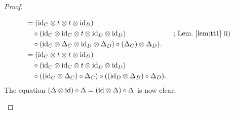 \begin{proof}
\begin{enumerate}[-]
\begin{align*}
        &= (\text{\rm id}_C\otimes t\otimes t\otimes\text{\rm id}_D)\\
        &\quad\circ(\text{\rm id}_C\otimes\text{\rm id}_C\otimes t\otimes\text{\rm id}_D\otimes\text{\rm id}_D)
                &&\text{; Lem.~\ref{lem:tt1}~ii)}\\
        &\quad\circ(\text{\rm id}_C\otimes\Delta_C\otimes\text{\rm id}_D\otimes\Delta_D)
            \circ(\Delta_C)\otimes\Delta_D).\\
        &= (\text{\rm id}_C\otimes t\otimes t\otimes\text{\rm id}_D)\\
        &\quad\circ(\text{\rm id}_C\otimes\text{\rm id}_C\otimes t\otimes\text{\rm id}_D\otimes\text{\rm id}_D)\\
        &\quad\circ((\text{\rm id}_C\otimes\Delta_C)\circ\Delta_C)
            \circ((\text{\rm id}_D\otimes\Delta_D)\circ\Delta_D).
    \end{align*}
    The equation $(\Delta\otimes\text{\rm id})\circ\Delta = (\text{\rm id}\otimes\Delta)\circ\Delta$ is now clear.


\end{enumerate}
\end{proof}
